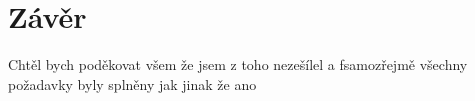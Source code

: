 \chapter{Závěr}
Chtěl bych poděkovat všem že jsem z toho nezešílel
a fsamozřejmě všechny požadavky byly splněny jak jinak že ano
\endinput